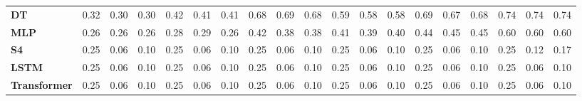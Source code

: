 \begin{table}[t]
{\begin{tabular}{l ccc ccc ccc ccc ccc ccc}
\textbf{DT} & \cellcolor[HTML]{FF885E}0.32 & \cellcolor[HTML]{FF8260}0.30 & \cellcolor[HTML]{FF8061}0.30 & \cellcolor[HTML]{FFB24B}0.42 & \cellcolor[HTML]{FFAF4C}0.41 & \cellcolor[HTML]{FFAF4C}0.41 & \cellcolor[HTML]{81D05A}0.68 & \cellcolor[HTML]{7CD05B}0.69 & \cellcolor[HTML]{81D05A}0.68 & \cellcolor[HTML]{BED24B}0.59 & \cellcolor[HTML]{C9D248}0.58 & \cellcolor[HTML]{C5D249}0.58 & \cellcolor[HTML]{7ED05B}0.69 & \cellcolor[HTML]{87D159}0.67 & \cellcolor[HTML]{84D059}0.68 & \cellcolor[HTML]{5ACF64}0.74 & \cellcolor[HTML]{59CF64}0.74 & \cellcolor[HTML]{5ACF64}0.74 \\
\textbf{MLP} & \cellcolor[HTML]{FF7069}0.26 & \cellcolor[HTML]{FF7168}0.26 & \cellcolor[HTML]{FF6E6A}0.26 & \cellcolor[HTML]{FF7965}0.28 & \cellcolor[HTML]{FF7B64}0.29 & \cellcolor[HTML]{FF6F69}0.26 & \cellcolor[HTML]{FFB44A}0.42 & \cellcolor[HTML]{FFA252}0.38 & \cellcolor[HTML]{FFA351}0.38 & \cellcolor[HTML]{FFAD4D}0.41 & \cellcolor[HTML]{FFA74F}0.39 & \cellcolor[HTML]{FFA94E}0.40 & \cellcolor[HTML]{FFBC46}0.44 & \cellcolor[HTML]{FFBF44}0.45 & \cellcolor[HTML]{FFBD45}0.45 & \cellcolor[HTML]{B6D24D}0.60 & \cellcolor[HTML]{BBD24C}0.60 & \cellcolor[HTML]{BAD24C}0.60 \\
\textbf{S4} & \cellcolor[HTML]{FF6B6B}0.25 & \cellcolor[HTML]{FF6B6B}0.06 & \cellcolor[HTML]{FF6B6B}0.10 & \cellcolor[HTML]{FF6B6B}0.25 & \cellcolor[HTML]{FF6B6B}0.06 & \cellcolor[HTML]{FF6B6B}0.10 & \cellcolor[HTML]{FF6B6B}0.25 & \cellcolor[HTML]{FF6B6B}0.06 & \cellcolor[HTML]{FF6B6B}0.10 & \cellcolor[HTML]{FF6B6B}0.25 & \cellcolor[HTML]{FF6B6B}0.06 & \cellcolor[HTML]{FF6B6B}0.10 & \cellcolor[HTML]{FF6B6B}0.25 & \cellcolor[HTML]{FF6B6B}0.06 & \cellcolor[HTML]{FF6B6B}0.10 & \cellcolor[HTML]{FF6C6B}0.25 & \cellcolor[HTML]{FF6B6B}0.12 & \cellcolor[HTML]{FF6B6B}0.17 \\
\textbf{LSTM} & \cellcolor[HTML]{FF6B6B}0.25 & \cellcolor[HTML]{FF6B6B}0.06 & \cellcolor[HTML]{FF6B6B}0.10 & \cellcolor[HTML]{FF6B6B}0.25 & \cellcolor[HTML]{FF6B6B}0.06 & \cellcolor[HTML]{FF6B6B}0.10 & \cellcolor[HTML]{FF6B6B}0.25 & \cellcolor[HTML]{FF6B6B}0.06 & \cellcolor[HTML]{FF6B6B}0.10 & \cellcolor[HTML]{FF6B6B}0.25 & \cellcolor[HTML]{FF6B6B}0.06 & \cellcolor[HTML]{FF6B6B}0.10 & \cellcolor[HTML]{FF6B6B}0.25 & \cellcolor[HTML]{FF6B6B}0.06 & \cellcolor[HTML]{FF6B6B}0.10 & \cellcolor[HTML]{FF6B6B}0.25 & \cellcolor[HTML]{FF6B6B}0.06 & \cellcolor[HTML]{FF6B6B}0.10 \\
\textbf{Transformer} & \cellcolor[HTML]{FF6B6B}0.25 & \cellcolor[HTML]{FF6B6B}0.06 & \cellcolor[HTML]{FF6B6B}0.10 & \cellcolor[HTML]{FF6B6B}0.25 & \cellcolor[HTML]{FF6B6B}0.06 & \cellcolor[HTML]{FF6B6B}0.10 & \cellcolor[HTML]{FF6B6B}0.25 & \cellcolor[HTML]{FF6B6B}0.06 & \cellcolor[HTML]{FF6B6B}0.10 & \cellcolor[HTML]{FF6B6B}0.25 & \cellcolor[HTML]{FF6B6B}0.06 & \cellcolor[HTML]{FF6B6B}0.10 & \cellcolor[HTML]{FF6B6B}0.25 & \cellcolor[HTML]{FF6B6B}0.06 & \cellcolor[HTML]{FF6B6B}0.10 & \cellcolor[HTML]{FF6B6B}0.25 & \cellcolor[HTML]{FF6B6B}0.06 & \cellcolor[HTML]{FF6B6B}0.10 \\

\end{tabular}}
\end{table}
